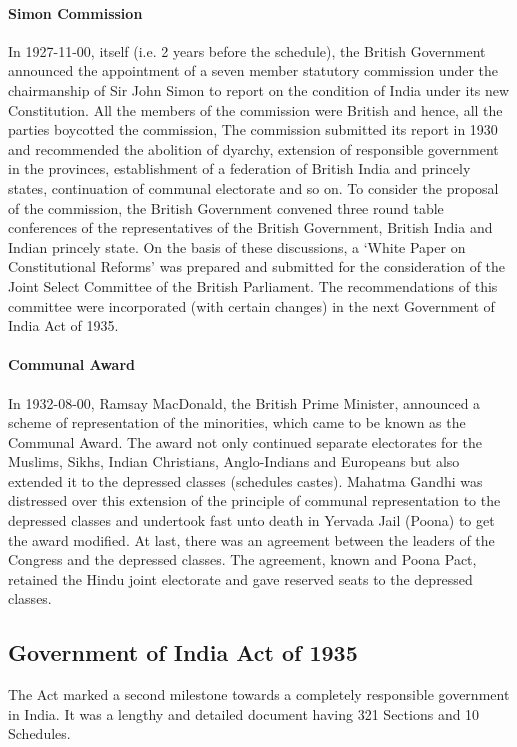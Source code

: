 \begin{multicols}{2}
\paragraph{Simon Commission}

In 1927-11-00, itself (i.e. 2 years before the schedule), the British Government announced the appointment of a seven member statutory commission under the chairmanship of Sir John Simon to report on the condition of India under its new Constitution. All the members of the commission were British and hence, all the parties boycotted the commission, The commission submitted its report in 1930 and recommended the abolition of dyarchy, extension of responsible government in the provinces, establishment of a federation of British India and princely states, continuation of communal electorate and so on. To consider the proposal of the commission, the British Government convened three round table conferences of the representatives of the British Government, British India and Indian princely state. On the basis of these discussions, a `White Paper on Constitutional Reforms' was prepared and submitted for the consideration of the Joint Select Committee of the British Parliament. The recommendations of this committee were incorporated (with certain changes) in the next Government of India Act of 1935.

\paragraph{Communal Award}
In 1932-08-00, Ramsay MacDonald, the British Prime Minister, announced a scheme of representation of the minorities, which came to be known as the Communal Award. The award not only continued separate electorates for the Muslims, Sikhs, Indian Christians, Anglo-Indians and Europeans but also extended it to the depressed classes (schedules castes). Mahatma Gandhi was distressed over this extension of the principle of communal representation to the depressed classes and undertook fast unto death in Yervada Jail (Poona) to get the award modified. At last, there was an agreement between the leaders of the Congress and the depressed classes. The agreement, known and Poona Pact, retained the Hindu joint electorate and gave reserved seats to the depressed classes.


\subsection{Government of India Act of 1935}
The Act marked a second milestone towards a completely responsible government in India. It was a lengthy and detailed document having 321 Sections and 10 Schedules.


\end{multicols}
